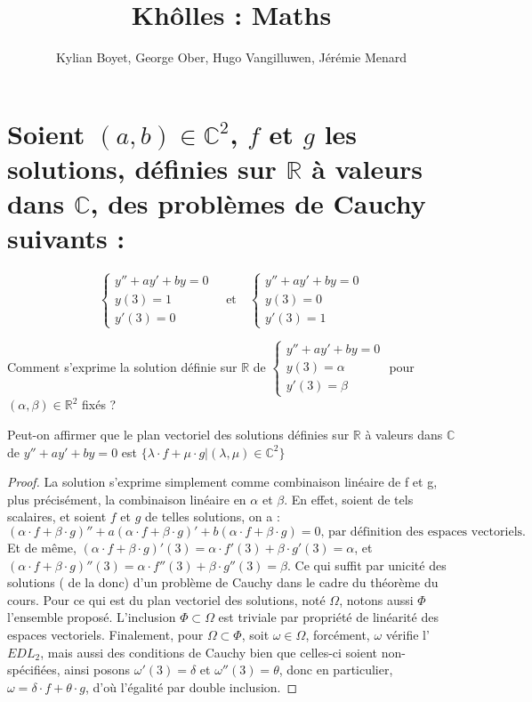 \documentclass{article}
\title{Khôlles : Maths}
\author{Kylian Boyet, George Ober, Hugo Vangilluwen, Jérémie Menard}
\begin{document}
\maketitle

\section{Soient $(a,b)\in \mathbb{C}^2$, $f$ et $g$ les  solutions, définies sur $\mathbb{R}$ à valeurs
  dans $\mathbb{C}$, des problèmes de Cauchy suivants :}


\[
  \left\{ \begin{array}{cl}
    y'' +ay'+by = 0 \\
    y(3) = 1        \\
    y'(3) = 0
  \end{array} \right.
  \quad \text{et} \quad
  \left\{ \begin{array}{cl}
    y'' +ay'+by = 0 \\
    y(3) = 0        \\
    y'(3) = 1
  \end{array} \right.
\]

Comment s'exprime la solution définie sur $\mathbb{R}$ de $\left\{ \begin{array}{cl}
    y'' +ay'+by = 0 \\
    y(3) = \alpha   \\
    y'(3) = \beta
  \end{array} \right. $ pour $(\alpha, \beta)\in \mathbb{R}^2$ fixés ?

Peut-on affirmer que le plan vectoriel des solutions définies sur $\mathbb{R}$ à valeurs dans
$\mathbb{C}$ de $y'' + ay' + by = 0$ est $\{ \lambda \cdot f + \mu \cdot g  |
  (\lambda, \mu)\in \mathbb{C}^2\}$

\begin{proof}
  La solution s'exprime simplement comme combinaison linéaire de f et g, plus précisément, la
  combinaison linéaire en $\alpha$ et $\beta$. En effet, soient de tels scalaires, et soient $f$ et
  $g$ de telles solutions, on a :
  \[
    (\alpha \cdot f + \beta \cdot g)'' + a (\alpha \cdot f + \beta \cdot g)' + b (\alpha \cdot f +
    \beta \cdot g) = 0 \text{, par définition des espaces vectoriels.}
  \]
  Et de même, $(\alpha \cdot f + \beta \cdot g)'(3) = \alpha \cdot f'(3) + \beta \cdot g'(3) = \alpha$,
  et $(\alpha \cdot f + \beta \cdot g)''(3) = \alpha \cdot f''(3) + \beta \cdot g''(3) = \beta$.
  \newline
  Ce qui suffit par unicité des solutions ( de la donc) d'un problème de Cauchy dans le cadre du
  théorème du cours.
  \newline
  Pour ce qui est du plan vectoriel des solutions, noté $\Omega$, notons aussi $\Phi$ l'ensemble proposé.
  L'inclusion $\Phi \subset \Omega$ est triviale par propriété de linéarité des espaces vectoriels.
  Finalement, pour $\Omega \subset \Phi$, soit $\omega \in \Omega$, forcément, $\omega$ vérifie
  l'$EDL_2$, mais aussi des conditions de Cauchy bien que celles-ci soient non-spécifiées, ainsi
  posons $\omega'(3) = \delta$ et $\omega''(3) = \theta$, donc en particulier, $ \omega =
    \delta \cdot f + \theta \cdot g$, d'où l'égalité par double inclusion.
\end{proof}
\end{document}

